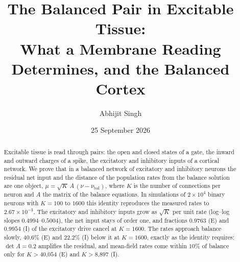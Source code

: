 \documentclass[11pt]{article}
\title{\textbf{The Balanced Pair in Excitable Tissue:}\\[4pt]
\large What a Membrane Reading Determines, and the Balanced Cortex}
\author{Abhijit Singh}
\date{25 September 2026}
\theoremstyle{definition}\newtheorem{definition}[theorem]{Definition}
\theoremstyle{remark}\newtheorem{remark}[theorem]{Remark}
\begin{document}
\maketitle
\begin{abstract}
Excitable tissue is read through pairs: the open and closed states of a gate, the inward and outward charges of a spike, the excitatory and inhibitory inputs of a cortical network. We prove that in a balanced network of excitatory and inhibitory neurons the residual net input and the distance of the population rates from the balance solution are one object, $\mu=\sqrt K\,A\,(\nu-\nu_{\mathrm{bal}})$, where $K$ is the number of connections per neuron and $A$ the matrix of the balance equations. In simulations of $2\times10^4$ binary neurons with $K=100$ to $1600$ this identity reproduces the measured rates to $2.67\times10^{-3}$. The excitatory and inhibitory inputs grow as $\sqrt K$ per unit rate (log--log slopes $0.4994$--$0.5004$), the net input stays of order one, and fractions $0.9763$ (E) and $0.9954$ (I) of the excitatory drive cancel at $K=1600$. The rates approach balance slowly, $40.6\%$ (E) and $22.2\%$ (I) below it at $K=1600$, exactly as the identity requires: $\det A=0.2$ amplifies the residual, and mean-field rates come within $10\%$ of balance only for $K>\text{40,054}$ (E) and $K>\text{8,897}$ (I).


\end{abstract}
\end{document}
